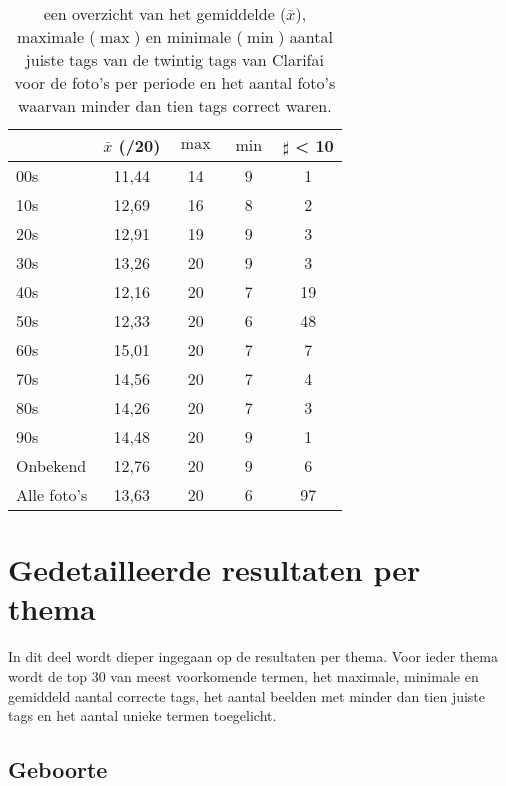 \begin{table}
    \renewcommand\arraystretch{1.2}
    \centering
	\begin{tabular}{p{3cm}|cccc}
		\toprule
		& $\bar{x}$ (/20) & $\max$ & $\min$ &  $\sharp$ < 10 \\ 
		\midrule
		00s & 11,44 & 14 & 9 & 1 \\ 
		10s & 12,69 & 16 & 8 &  2 \\ 
		20s & 12,91 & 19 & 9 & 3 \\ 
		30s & 13,26 & 20 & 9  & 3 \\ 
		40s & 12,16 & 20 & 7  & 19 \\ 
		50s & 12,33 & 20 & 6  & 48 \\ 
		60s & 15,01 & 20 & 7  & 7 \\ 
		70s & 14,56 & 20 & 7  & 4 \\ 
		80s & 14,26 & 20 & 7  & 3 \\ 
		90s & 14,48 & 20 & 9  & 1 \\ 
		Onbekend & 12,76 & 20 & 9  & 6 \\ 
		Alle foto's & 13,63 & 20 & 6  & 97 \\ 
		\bottomrule
	\end{tabular} 
	\caption[een overzicht van de resultaten per periode na gebruikt van het ingebouwde model van Clarifai]{een overzicht van het gemiddelde ($\bar{x}$), maximale ($\max$) en minimale ($\min$) aantal juiste tags van de twintig tags van Clarifai voor de foto’s per periode en het aantal foto’s waarvan minder dan tien tags correct waren. }
	\label{tab:analyse-resultaten-periode}
\end{table}

\section{Gedetailleerde resultaten per thema}
\label{sec:gedetailleerde-resultaten-per-thema}

In dit deel wordt dieper ingegaan op de resultaten per thema. Voor ieder thema wordt de top 30 van meest voorkomende termen, het maximale, minimale en gemiddeld aantal correcte tags, het aantal beelden met minder dan tien juiste tags en het aantal unieke termen toegelicht. 

\subsection{Geboorte}

